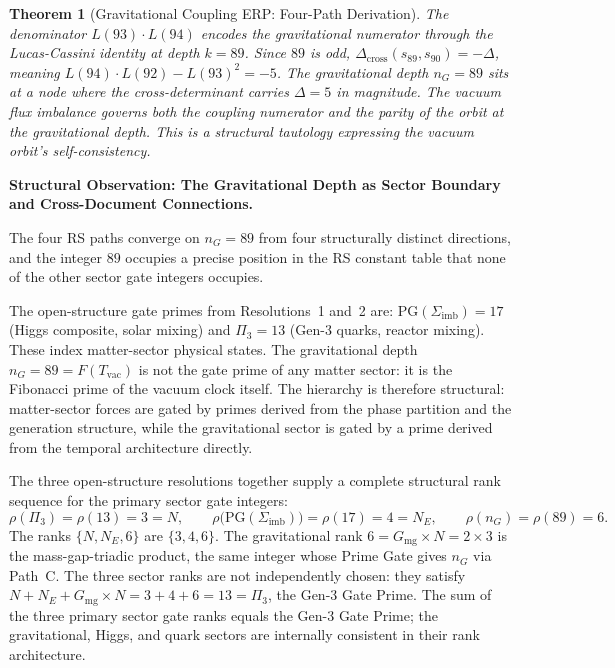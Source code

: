 \documentclass[11pt, letterpaper]{article}
\newcommand{\Dcross}{\Delta_{\mathrm{cross}}}
\theoremstyle{definition}
\theoremstyle{plain}
\newtheorem{theorem}{Theorem}[section]
\begin{document}
\begin{theorem}[Gravitational Coupling ERP: Four-Path Derivation]
The denominator $L(93) \cdot L(94)$ encodes the gravitational numerator through the Lucas-Cassini identity at depth $k = 89$. Since $89$ is odd, $\Dcross(s_{89}, s_{90}) = -\Delta$, meaning $L(94)\cdot L(92) - L(93)^2 = -5$. The gravitational depth $n_G = 89$ sits at a node where the cross-determinant carries $\Delta = 5$ in magnitude. The vacuum flux imbalance governs both the coupling numerator and the parity of the orbit at the gravitational depth. This is a structural tautology expressing the vacuum orbit's self-consistency.
\end{theorem}

\begin{observebox}
\textbf{Structural Observation: The Gravitational Depth as Sector Boundary and
Cross-Document Connections.}

The four RS paths converge on $n_G = 89$ from four structurally distinct directions,
and the integer $89$ occupies a precise position in the RS constant table that none
of the other sector gate integers occupies.

The open-structure gate primes from Resolutions~1 and~2 are:
$\mathrm{PG}(\Sigma_\mathrm{imb}) = 17$ (Higgs composite, solar mixing) and $\Pi_3 = 13$
(Gen-3 quarks, reactor mixing). These index matter-sector physical states.
The gravitational depth $n_G = 89 = F(T_\mathrm{vac})$ is not the gate prime of any
matter sector: it is the Fibonacci prime of the vacuum clock itself. The hierarchy is
therefore structural: matter-sector forces are gated by primes derived from the phase
partition and the generation structure, while the gravitational sector is gated by
a prime derived from the temporal architecture directly.

The three open-structure resolutions together supply a complete structural rank sequence
for the primary sector gate integers:
\[
\rho(\Pi_3) = \rho(13) = 3 = N, \qquad
\rho\bigl(\mathrm{PG}(\Sigma_\mathrm{imb})\bigr) = \rho(17) = 4 = N_E, \qquad
\rho(n_G) = \rho(89) = 6.
\]
The ranks $\{N, N_E, 6\}$ are $\{3, 4, 6\}$. The gravitational rank $6 = G_\mathrm{mg}
\times N = 2 \times 3$ is the mass-gap-triadic product, the same integer whose Prime Gate
gives $n_G$ via Path~C. The three sector ranks are not independently chosen: they
satisfy $N + N_E + G_\mathrm{mg} \times N = 3 + 4 + 6 = 13 = \Pi_3$, the Gen-3 Gate
Prime. The sum of the three primary sector gate ranks equals the Gen-3 Gate Prime;
the gravitational, Higgs, and quark sectors are internally consistent in their
rank architecture.


\end{observebox}
\end{document}
